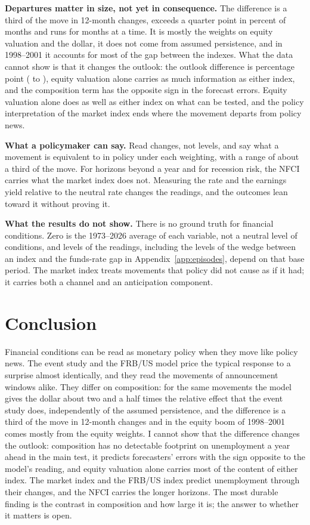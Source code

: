 \documentclass[11pt]{article}
\begin{document}
\textbf{Departures matter in size, not yet in consequence.} The difference is a third of the move in 12-month changes, exceeds a quarter point in  percent of months and runs for months at a time. It is mostly the weights on equity valuation and the dollar, it does not come from assumed persistence, and in 1998--2001 it accounts for most of the gap between the indexes. What the data cannot show is that it changes the outlook: the outlook difference is  percentage point ( to ), equity valuation alone carries as much information as either index, and the composition term has the opposite sign in the forecast errors. Equity valuation alone does as well as either index on what can be tested, and the policy interpretation of the market index ends where the movement departs from policy news.

\textbf{What a policymaker can say.} Read changes, not levels, and say what a movement is equivalent to in policy under each weighting, with a range of about a third of the move. For horizons beyond a year and for recession risk, the NFCI carries what the market index does not. Measuring the rate and the earnings yield relative to the neutral rate changes the readings, and the outcomes lean toward it without proving it.

\textbf{What the results do not show.} There is no ground truth for financial conditions. Zero is the 1973--2026 average of each variable, not a neutral level of conditions, and levels of the readings, including the levels of the wedge between an index and the funds-rate gap in Appendix~\ref{app:episodes}, depend on that base period. The market index treats movements that policy did not cause as if it had; it carries both a channel and an anticipation component.
\FloatBarrier

\section{Conclusion}\label{sec:conclusion}
Financial conditions can be read as monetary policy when they move like policy news. The event study and the FRB/US model price the typical response to a surprise almost identically, and they read the movements of announcement windows alike. They differ on composition: for the same movements the model gives the dollar about two and a half times the relative effect that the event study does, independently of the assumed persistence, and the difference is a third of the move in 12-month changes and in the equity boom of 1998--2001 comes mostly from the equity weights. I cannot show that the difference changes the outlook: composition has no detectable footprint on unemployment a year ahead in the main test, it predicts forecasters' errors with the sign opposite to the model's reading, and equity valuation alone carries most of the content of either index. The market index and the FRB/US index predict unemployment through their changes, and the NFCI carries the longer horizons. The most durable finding is the contrast in composition and how large it is; the answer to whether it matters is open.
\end{document}
